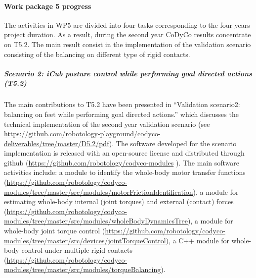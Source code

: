 
\paragraph{Work package 5 progress}

The activities in WP5 are divided into four tasks corresponding to the four years project duration. As a result, during the second year CoDyCo results concentrate on T5.2. The main result consist in the implementation of the validation scenario consisting of the balancing on different type of rigid contacts.

\subparagraph{Scenario 2: iCub posture control while performing goal directed actions (T5.2)}

The main contributions to T5.2 have been presented in ``Validation scenario2: balancing on feet while performing goal directed actions.'' which discusses the technical implementation of the second year validation scenario (see \url{https://github.com/robotology-playground/codyco-deliverables/tree/master/D5.2/pdf}). The software developed for the scenario implementation is released with an open-source license and distributed through github (\url{https://github.com/robotology/codyco-modules} ). The main software activities include: a module to identify the whole-body motor transfer functions (\url{https://github.com/robotology/codyco-modules/tree/master/src/modules/motorFrictionIdentification}), a module for estimating whole-body internal (joint torques) and external (contact) forces (\url{https://github.com/robotology/codyco-modules/tree/master/src/modules/wholeBodyDynamicsTree}), a module for whole-body joint torque control (\url{https://github.com/robotology/codyco-modules/tree/master/src/devices/jointTorqueControl}), a C++ module for whole-body control under multiple rigid contacts (\url{https://github.com/robotology/codyco-modules/tree/master/src/modules/torqueBalancing}).



